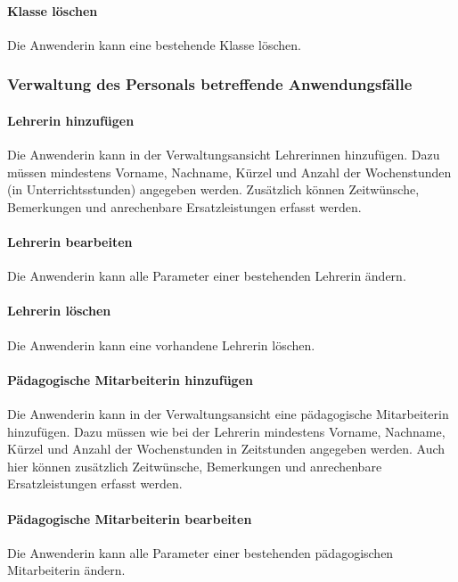 \documentclass[fontsize=12pt,paper=a4,twoside]{scrartcl}
\begin{document}
\paragraph{Klasse löschen} Die Anwenderin kann eine bestehende Klasse löschen.




\subsubsection{Verwaltung des Personals betreffende Anwendungsfälle}

\paragraph{Lehrerin hinzufügen}
Die Anwenderin kann in der Verwaltungsansicht Lehrerinnen hinzufügen. Dazu müssen mindestens Vorname, Nachname, Kürzel und Anzahl der Wochenstunden (in Unterrichtsstunden) angegeben werden. Zusätzlich können Zeitwünsche, Bemerkungen und anrechenbare Ersatzleistungen erfasst werden.

\paragraph{Lehrerin bearbeiten}
Die Anwenderin kann alle Parameter einer bestehenden Lehrerin ändern.

\paragraph{Lehrerin löschen}
Die Anwenderin kann eine vorhandene Lehrerin löschen.

\paragraph{Pädagogische Mitarbeiterin hinzufügen}
Die Anwenderin kann in der Verwaltungsansicht eine pädagogische Mitarbeiterin hinzufügen. Dazu müssen wie bei der Lehrerin mindestens Vorname, Nachname, Kürzel und Anzahl der Wochenstunden in Zeitstunden angegeben werden. Auch hier können zusätzlich Zeitwünsche, Bemerkungen und anrechenbare Ersatzleistungen erfasst werden.

\paragraph{Pädagogische Mitarbeiterin bearbeiten}
Die Anwenderin kann alle Parameter einer bestehenden pädagogischen Mitarbeiterin ändern.
\end{document}
